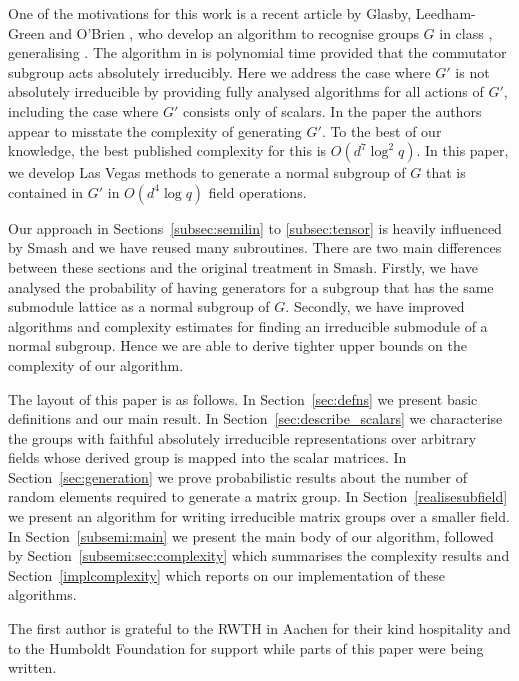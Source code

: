 One of the motivations for this work is a 
recent article by Glasby, Leedham-Green and 
O'Brien \cite{GLGOB}, who develop an algorithm 
to recognise  groups $G$ in class ,  
generalising   
\cite{GlasbyHowlett}. The algorithm in \cite{GLGOB} 
is polynomial time provided that the commutator 
subgroup acts absolutely 
irreducibly. Here we address the case where $G'$ 
is not absolutely irreducible by providing fully 
analysed algorithms for all 
actions of $G'$, including the case where $G'$ 
consists only of scalars.  In the paper \cite{GLGOB} 
the authors appear to misstate the complexity of 
generating $G'$. To the best of our knowledge,
the best published complexity for this is 
$O(d^7 \log^2 q)$. In this paper, we develop Las Vegas methods to generate 
a normal subgroup of $G$ that is contained in $G'$ in $O(d^4 \log q)$ field 
operations. 

Our approach in Sections~\ref{subsec:semilin} 
to \ref{subsec:tensor} is heavily influenced 
by {\sc Smash} \cite{smashnormal} and we have reused 
many subroutines. There are two main differences between 
these sections and the original treatment in 
{\sc Smash}. Firstly, we have analysed the probability of having
generators for a subgroup 
that has the same submodule lattice as a normal 
subgroup of $G$. Secondly, we have improved algorithms and 
complexity estimates for finding an irreducible 
submodule of a normal subgroup. Hence we are able to derive 
tighter upper bounds on the complexity
of our algorithm.

The layout of this paper is as follows. In Section~\ref{sec:defns}
 we present basic definitions and our main result. In 
Section~\ref{sec:describe_scalars} we characterise the groups with 
faithful absolutely irreducible representations over arbitrary fields
 whose derived group 
is mapped into the scalar matrices. In 
Section~\ref{sec:generation} we prove probabilistic results 
about the number of random elements required to generate  a matrix group. 
In Section~\ref{realisesubfield} we present an 
algorithm for writing irreducible matrix groups over a smaller field. 
In Section~\ref{subsemi:main} we present the main body of our algorithm,
followed by Section~\ref{subsemi:sec:complexity} which summarises the complexity 
results and Section~\ref{implcomplexity} which reports on our implementation 
of these algorithms. 

The first author is grateful to the RWTH in Aachen for their kind 
hospitality and to the Humboldt Foundation for support while parts of
this paper were being written. 

